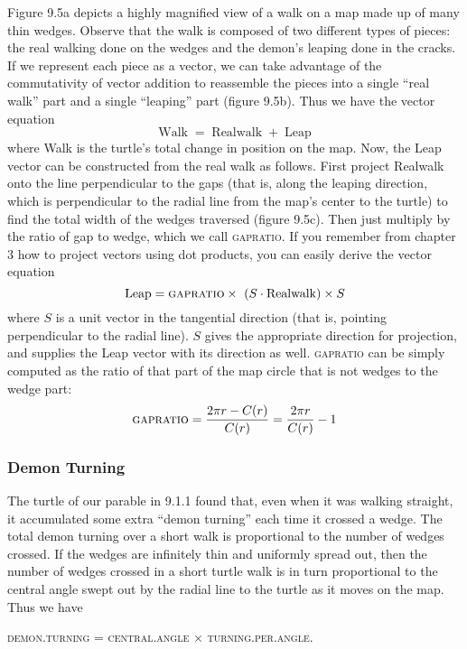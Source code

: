 \documentclass{book}
\begin{document}
Figure 9.5a depicts a highly magnified view of a walk on a map made up
of many thin wedges. Observe that the walk is composed of two different
types of pieces: the real walking done on the wedges and the demon's
leaping done in the cracks. If we represent each piece as a vector, we can
take advantage of the commutativity of vector addition to reassemble
the pieces into a single ``real walk'' part and a single ``leaping'' part
(figure 9.5b). Thus we have the vector equation
$$\operatorname{Walk} = \operatorname{Realwalk} + \operatorname{Leap}$$
where Walk is the turtle's total change in position on the map.
Now, the Leap vector can be constructed from the real walk as follows.
First project Realwalk onto the line perpendicular to the gaps (that
is, along the leaping direction, which is perpendicular to the radial
line from the map's center to the turtle) to find the total width of the
wedges traversed (figure 9.5c). Then just multiply by the ratio of gap to
wedge, which we call \textsc{gapratio}. If you remember from chapter 3 how
to project vectors using dot products, you can easily derive the vector
equation
$$\operatorname{Leap} =  \text{\textsc{gapratio}}  \times\ (S \cdot \operatorname{Realwalk}) \times S$$ 
where $S$ is a unit vector in the tangential direction (that is, pointing
perpendicular to the radial line). $S$ gives the appropriate direction
for projection, and supplies the Leap vector with its direction as well.
\textsc{gapratio} can be simply computed as the ratio of that part of the map
circle that is not wedges to the wedge part:
$$\text{\textsc{gapratio}} = \frac {2 \pi r - C(r)}{C(r)} = \frac {2 \pi r} {C(r)} - 1 $$

\subsubsection{Demon Turning}

The turtle of our parable in 9.1.1 found that, even when it was walking straight, it accumulated some extra ``demon turning'' each time it
crossed a wedge. The total demon turning over a short walk is proportional to the number of wedges crossed. If the wedges are infinitely thin
and uniformly spread out, then the number of wedges crossed in a short
turtle walk is in turn proportional to the central angle swept out by the
radial line to the turtle as it moves on the map. Thus we have

\textsc{demon}\textsc{.turning} = \textsc{central}\textsc{.angle} $\times$ \textsc{turning}\textsc{.per}\textsc{.angle}. 
\end{document}
